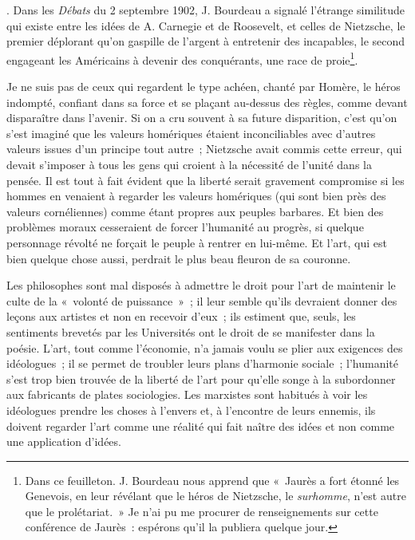 \documentclass[french,twoside]{book} %
\begin{document}
{ }. Dans les \emph{Débats} du 2 septembre 1902, J. Bourdeau a signalé l’étrange similitude qui existe entre les idées de A. Carnegie et de Roosevelt, et celles de Nietzsche, le premier déplorant qu’on gaspille de l’argent à entretenir des incapables, le second engageant les Américains à devenir des conquérants, une race de proie\footnote{ \noindent Dans ce feuilleton. J. Bourdeau nous apprend que « Jaurès a fort étonné les Genevois, en leur révélant que le héros de Nietzsche, le \emph{surhomme}, n’est autre que le prolétariat. » Je n’ai pu me procurer de renseignements sur cette conférence de Jaurès : espérons qu’il la publiera quelque jour.
 }.\par
 Je ne suis pas de ceux qui regardent le type achéen, chanté par Homère, le héros indompté, confiant dans sa force et se plaçant au-dessus des règles, comme devant disparaître dans l’avenir. Si on a cru souvent à sa future disparition, c’est qu’on s’est imaginé que les valeurs homériques étaient inconciliables avec d’autres valeurs issues d’un principe tout autre ; Nietzsche avait commis cette erreur, qui devait s’imposer à tous les gens qui croient à la nécessité de l’unité dans la pensée. Il est tout à fait évident que la liberté serait gravement compromise si les hommes en venaient à regarder les valeurs homériques (qui sont bien près des valeurs cornéliennes) comme étant propres aux peuples barbares. Et bien des problèmes moraux cesseraient de forcer l’humanité au progrès, si quelque personnage révolté ne forçait le peuple à rentrer en lui-même. Et l’art, qui est bien quelque chose aussi, perdrait le plus beau fleuron de sa couronne.\par
Les philosophes sont mal disposés à admettre le droit pour l’art de maintenir le culte de la « volonté de puissance » ; il leur semble qu’ils devraient donner des leçons aux artistes et non en recevoir d’eux ; ils estiment que, seuls, les sentiments brevetés par les Universités ont le droit de se manifester dans la poésie. L’art, tout comme l’économie, n’a jamais voulu se plier aux exigences des idéologues ; il se permet de troubler leurs plans d’harmonie sociale ; l’humanité s’est trop bien trouvée de la liberté de l’art pour qu’elle songe à la subordonner aux fabricants de plates sociologies. Les marxistes sont habitués à voir les idéologues prendre les choses à l’envers et, à l’encontre de leurs ennemis, ils doivent regarder l’art comme une  réalité qui fait naître des idées et non comme une application d’idées.\par
\end{document}
